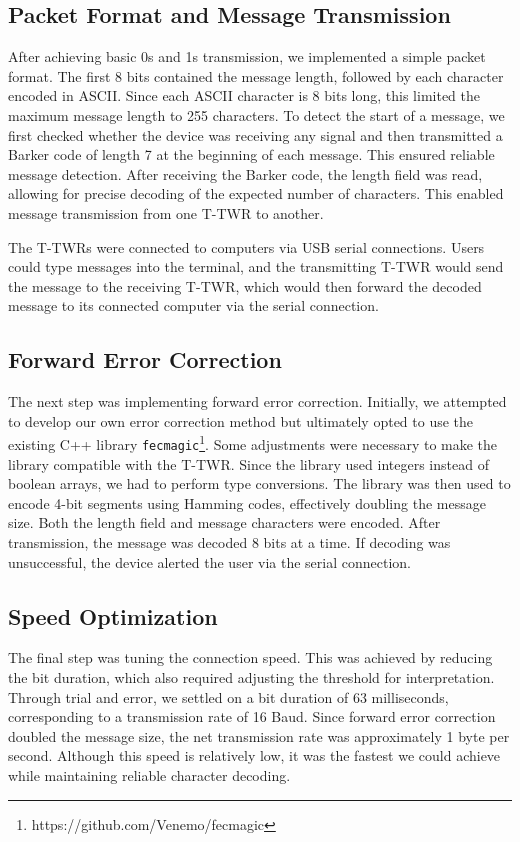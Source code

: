\subsection{Packet Format and Message Transmission}

After achieving basic 0s and 1s transmission, we implemented a simple packet format. The first 8 bits contained the message length, followed by each character encoded in ASCII. Since each ASCII character is 8 bits long, this limited the maximum message length to 255 characters. To detect the start of a message, we first checked whether the device was receiving any signal and then transmitted a Barker code of length 7 at the beginning of each message. This ensured reliable message detection. After receiving the Barker code, the length field was read, allowing for precise decoding of the expected number of characters. This enabled message transmission from one T-TWR to another.

The T-TWRs were connected to computers via USB serial connections. Users could type messages into the terminal, and the transmitting T-TWR would send the message to the receiving T-TWR, which would then forward the decoded message to its connected computer via the serial connection.

\subsection{Forward Error Correction}

The next step was implementing forward error correction. Initially, we attempted to develop our own error correction method but ultimately opted to use the existing C++ library \texttt{fecmagic}\footnote{https://github.com/Venemo/fecmagic}. Some adjustments were necessary to make the library compatible with the T-TWR. Since the library used integers instead of boolean arrays, we had to perform type conversions. The library was then used to encode 4-bit segments using Hamming codes, effectively doubling the message size. Both the length field and message characters were encoded. After transmission, the message was decoded 8 bits at a time. If decoding was unsuccessful, the device alerted the user via the serial connection.

\subsection{Speed Optimization}

The final step was tuning the connection speed. This was achieved by reducing the bit duration, which also required adjusting the threshold for interpretation. Through trial and error, we settled on a bit duration of 63 milliseconds, corresponding to a transmission rate of 16 Baud. Since forward error correction doubled the message size, the net transmission rate was approximately 1 byte per second. Although this speed is relatively low, it was the fastest we could achieve while maintaining reliable character decoding.

